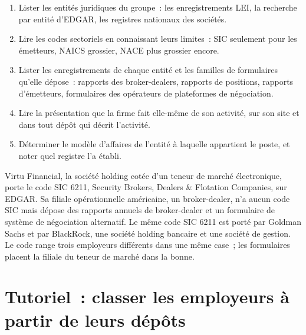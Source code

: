 \begin{method}\label{met:in:a-map-of-the-industry:place}
\begin{enumerate}
\item Lister les entités juridiques du groupe~: les enregistrements LEI, la recherche par entité d'EDGAR, les registres nationaux des sociétés.
\item Lire les codes sectoriels en connaissant leurs limites~: SIC seulement pour les émetteurs, NAICS grossier, NACE plus grossier encore.
\item Lister les enregistrements de chaque entité et les familles de formulaires qu'elle dépose~: rapports des broker-dealers, rapports de positions,
rapports d'émetteurs, formulaires des opérateurs de plateformes de négociation.
\item Lire la présentation que la firme fait elle-même de son activité, sur son site et dans tout dépôt qui décrit l'activité.
\item Déterminer le modèle d'affaires de l'entité à laquelle appartient le poste, et noter quel registre l'a établi.
\end{enumerate}
\end{method}

\begin{example}\label{ex:in:a-map-of-the-industry:codes}
Virtu Financial, la société holding cotée d'un teneur de marché électronique, porte le code SIC 6211, Security Brokers,
Dealers \& Flotation Companies, sur EDGAR. Sa filiale opérationnelle américaine, un broker-dealer, n'a aucun code SIC mais dépose
des rapports annuels de broker-dealer et un formulaire de système de négociation alternatif. Le même code SIC 6211 est porté par Goldman Sachs
et par BlackRock, une société holding bancaire et une société de gestion. Le code range trois employeurs différents dans une même case~; les
formulaires placent la filiale du teneur de marché dans la bonne.
\end{example}

\section{Tutoriel~: classer les employeurs à partir de leurs dépôts}\label{tut:in:a-map-of-the-industry:tut}

